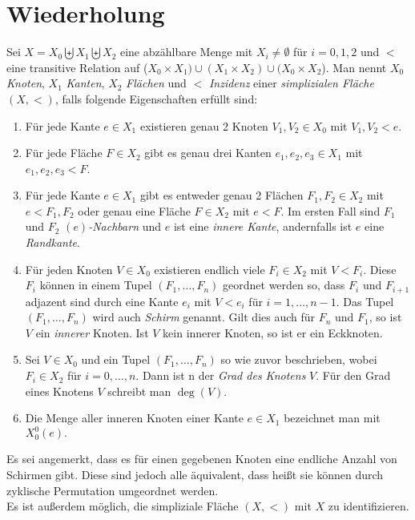 \documentclass[12pt,titlepage]{article}
\begin{document}
\section{Wiederholung}
\begin{definition}  \label{def1} Sei $X=X_{0} \biguplus X_{1} \biguplus X_{2}$ eine abzählbare Menge mit $X_{i} \ne \emptyset$ für $i=0,1,2$ und $<$ eine transitive Relation auf  ($X_{0}\times X_{1}) \cup (X_{1}\times X_{2})\cup (X_{0}\times X_{2}$). Man nennt $X_{0}$ \emph{Knoten}, $X_{1}$ \emph{Kanten}, $X_{2}$ \emph{Flächen} und $<$ \emph{Inzidenz} einer \emph{simplizialen Fläche} $(X,<)$, falls folgende Eigenschaften erfüllt sind:
 \begin{enumerate}
\item Für jede Kante $e \in X_{1}$ existieren genau 2 Knoten $V_1,V_2 \in X_{0}$ mit $V_1,V_2 < e$. 
\item Für jede Fläche $F\in X_2$ gibt es genau drei Kanten $e_1,e_2,e_3 \in X_{1}$ mit $e_1,e_2,e_3 < F$. 
\item Für jede Kante $e \in X_{1}$ gibt es entweder genau 2 Flächen $F_{1},F_{2} \in X_{2}$ mit $e <F_{1},F_2$ oder
genau eine Fläche $F \in X_{2}$ mit $e < F$. Im ersten Fall sind $F_{1}$ und $F_{2}$ \emph{$(e)$-Nachbarn} und $e$ ist eine \emph{innere Kante}, andernfalls ist $e$ eine \emph{Randkante}. 
\item Für jeden Knoten $V \in X_{0}$ existieren endlich viele $F_{i}\in X_{2}$ mit $V < F_{i}$. Diese $F_{i}$ können in einem Tupel $(F_{1},\ldots,F_{n})$ geordnet werden so, dass $F_{i}$ und $F_{i+1}$ adjazent sind durch eine Kante $e_{i}$ mit $V <e_{i}$ für $i=1, \ldots, n-1$. Das Tupel $(F_1,\ldots,F_n)$ wird auch \emph{Schirm} genannt. Gilt dies auch für $F_{n}$ und $F_{1}$, so ist $V$ ein \emph{innerer} Knoten. Ist $V$ kein innerer Knoten, so ist er 
 ein Eckknoten. 
 \item Sei $V \in X_0$ und ein Tupel $(F_1,\ldots,F_n)$ so wie zuvor beschrieben, wobei $F_i \in X_2$ für $i=0,\ldots,n$. Dann ist n der \emph{Grad des Knotens} $V$. Für den Grad eines Knotens $V$ schreibt man $\deg(V)$.
 \item Die Menge aller inneren Knoten einer Kante $e \in X_1$ bezeichnet man mit $X_0^0(e).$
\end{enumerate}
\end{definition}
Es sei angemerkt, dass es für einen gegebenen Knoten eine endliche Anzahl von Schirmen gibt. Diese sind jedoch alle äquivalent, dass heißt sie können durch zyklische Permutation umgeordnet werden.\\ Es ist außerdem möglich, die simpliziale Fläche $(X,<)$ mit $X$ zu identifizieren.
\end{document}
